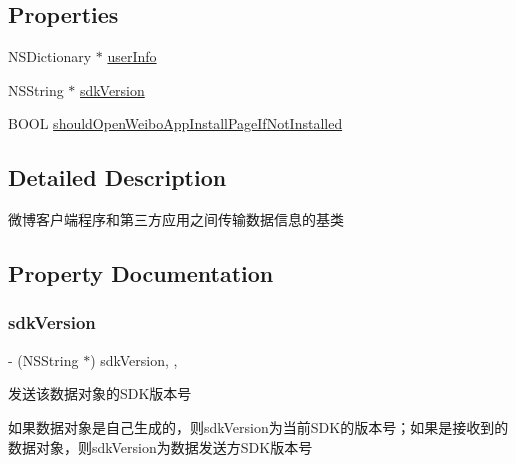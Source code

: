\subsection*{Properties}
\begin{DoxyCompactItemize}
\item 
N\+S\+Dictionary $\ast$ \mbox{\hyperlink{interface_w_b_data_transfer_object_ab9b7bf91e1470d29782202c04d1a86fe}{user\+Info}}
\item 
N\+S\+String $\ast$ \mbox{\hyperlink{interface_w_b_data_transfer_object_a5140d85c4f3bb9c618300a3611288893}{sdk\+Version}}
\item 
B\+O\+OL \mbox{\hyperlink{interface_w_b_data_transfer_object_af1046c4ff92a1f7a3c7129384fc090ed}{should\+Open\+Weibo\+App\+Install\+Page\+If\+Not\+Installed}}
\end{DoxyCompactItemize}


\subsection{Detailed Description}
微博客户端程序和第三方应用之间传输数据信息的基类 

\subsection{Property Documentation}
\mbox{\label{interface_w_b_data_transfer_object_a5140d85c4f3bb9c618300a3611288893}} 
\subsubsection{\texorpdfstring{sdk\+Version}{sdkVersion}}
{\footnotesize\ttfamily -\/ (N\+S\+String $\ast$) sdk\+Version\hspace{0.3cm}{\ttfamily [read]}, {\ttfamily [nonatomic]}, {\ttfamily [strong]}}

发送该数据对象的\+S\+D\+K版本号

如果数据对象是自己生成的，则sdk\+Version为当前\+S\+D\+K的版本号；如果是接收到的数据对象，则sdk\+Version为数据发送方\+S\+D\+K版本号 \mbox{\label{interface_w_b_data_transfer_object_af1046c4ff92a1f7a3c7129384fc090ed}} 
